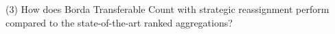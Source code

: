 (3) How does Borda Transferable Count with strategic reassignment perform compared to the state-of-the-art ranked aggregations?


